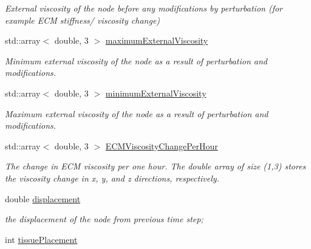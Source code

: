 \begin{DoxyCompactItemize}
\begin{DoxyCompactList}\small\item\em External viscosity of the node before any modifications by perturbation (for example E\+C\+M stiffness/ viscosity change) \end{DoxyCompactList}\item 
\hypertarget{classNode_a78523720b4a1758f38d4e8b1703ad6c3}{}std\+::array$<$ double, 3 $>$ \hyperlink{classNode_a78523720b4a1758f38d4e8b1703ad6c3}{maximum\+External\+Viscosity}\label{classNode_a78523720b4a1758f38d4e8b1703ad6c3}

\begin{DoxyCompactList}\small\item\em Minimum external viscosity of the node as a result of perturbation and modifications. \end{DoxyCompactList}\item 
\hypertarget{classNode_a59528693432e71fa9b9e7ecfef6ee274}{}std\+::array$<$ double, 3 $>$ \hyperlink{classNode_a59528693432e71fa9b9e7ecfef6ee274}{minimum\+External\+Viscosity}\label{classNode_a59528693432e71fa9b9e7ecfef6ee274}

\begin{DoxyCompactList}\small\item\em Maximum external viscosity of the node as a result of perturbation and modifications. \end{DoxyCompactList}\item 
\hypertarget{classNode_a58afaee3d71a2c122396265c91acda04}{}std\+::array$<$ double, 3 $>$ \hyperlink{classNode_a58afaee3d71a2c122396265c91acda04}{E\+C\+M\+Viscosity\+Change\+Per\+Hour}\label{classNode_a58afaee3d71a2c122396265c91acda04}

\begin{DoxyCompactList}\small\item\em The change in E\+C\+M viscosity per one hour. The double array of size (1,3) stores the viscosity change in x, y, and z directions, respectively. \end{DoxyCompactList}\item 
\hypertarget{classNode_a1f25afa638813548bef54299c2d756e4}{}double \hyperlink{classNode_a1f25afa638813548bef54299c2d756e4}{displacement}\label{classNode_a1f25afa638813548bef54299c2d756e4}

\begin{DoxyCompactList}\small\item\em the displacement of the node from previous time step; \end{DoxyCompactList}\item 
\hypertarget{classNode_af754322e3928dc45f70b19762551890a}{}int \hyperlink{classNode_af754322e3928dc45f70b19762551890a}{tissue\+Placement}\label{classNode_af754322e3928dc45f70b19762551890a}


\end{DoxyCompactItemize}
